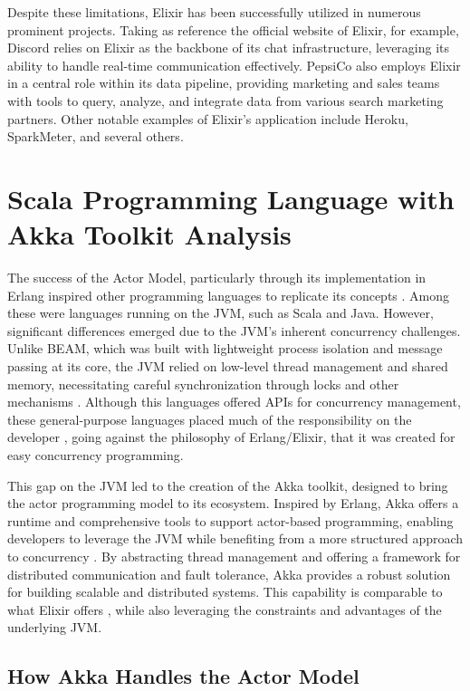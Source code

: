 Despite these limitations, Elixir has been successfully utilized in numerous prominent projects. Taking as reference the official website of Elixir, for example, Discord relies on Elixir as the backbone of its chat infrastructure, leveraging its ability to handle real-time communication effectively. PepsiCo also employs Elixir in a central role within its data pipeline, providing marketing and sales teams with tools to query, analyze, and integrate data from various search marketing partners. Other notable examples of Elixir's application include Heroku, SparkMeter, and several others.

\section{Scala Programming Language with Akka Toolkit Analysis}

The success of the Actor Model, particularly through its implementation in Erlang inspired other programming languages to replicate its concepts \cite{Juric2024,Abraham2023}. Among these were languages running on the \gls{JVM}, such as Scala and Java. However, significant differences emerged due to the JVM’s inherent concurrency challenges. Unlike \gls{BEAM}, which was built with lightweight process isolation and message passing at its core, the \gls{JVM} relied on low-level thread management and shared memory, necessitating careful synchronization through locks and other mechanisms \cite{Abraham2023,Valkov2018}. Although this languages offered \gls{API}s for concurrency management, these general-purpose languages placed much of the responsibility on the developer \cite{Abraham2023,akka-docs}, going against the philosophy of Erlang/Elixir, that it was created for easy concurrency programming.

This gap on the \gls{JVM} led to the creation of the Akka toolkit, designed to bring the actor programming model to its ecosystem. Inspired by Erlang, Akka offers a runtime and comprehensive tools to support actor-based programming, enabling developers to leverage the \gls{JVM} while benefiting from a more structured approach to concurrency \cite{akka-docs}. By abstracting thread management and offering a framework for distributed communication and fault tolerance, Akka provides a robust solution for building scalable and distributed systems. This capability is comparable to what Elixir offers \cite{Abraham2023}, while also leveraging the constraints and advantages of the underlying JVM.

\subsection{How Akka Handles the Actor Model}

